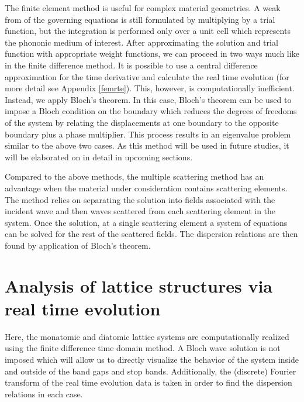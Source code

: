 \documentclass{article}
\begin{document}
The finite element method is useful for complex material geometries. A weak 
from of the governing equations is still 
formulated by multiplying by a trial function, but the integration is performed 
only over a unit cell which represents the phononic medium of interest. After 
approximating the solution and trial function with appropriate weight 
functions, we can proceed in two ways much like in the finite difference 
method. It is possible to use a central difference approximation for the time 
derivative and calculate the real time evolution (for more detail see Appendix 
\ref{femrte}). This, however, is 
computationally inefficient. Instead, we apply Bloch's theorem. In this case, 
Bloch's theorem can be used to impose a Bloch condition on the 
boundary which reduces the degrees of freedoms of the system by relating the 
displacements at one boundary to the opposite boundary plus a phase multiplier.
This process results in an eigenvalue problem similar to the above two cases. 
As this method will be used in future studies, it will be elaborated on in 
detail in upcoming sections.

Compared to the above methods, the multiple scattering method has an advantage 
when the material under consideration contains scattering elements. The method 
relies on separating the solution into fields associated with the incident wave 
and then waves scattered from each scattering element in the system. Once the 
solution, at a single scattering element a system of equations can be solved 
for the rest of the scattered fields. The dispersion relations are then found 
by application of Bloch's theorem. 

\section{Analysis of lattice structures via real time evolution}
Here, the monatomic and diatomic lattice systems are computationally realized
using the finite difference time domain method. A Bloch wave solution is not 
imposed which will allow us to directly visualize the behavior of the 
system inside and outside of the band gaps and stop bands. Additionally, the 
(discrete) Fourier transform of the real time evolution data is taken in order 
to find the dispersion relations in each case. 
\end{document}
